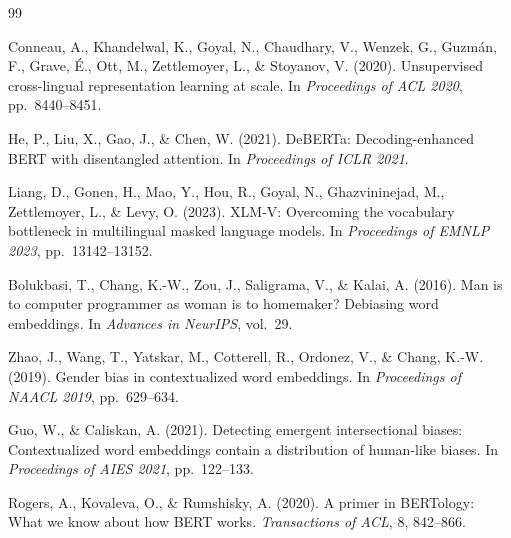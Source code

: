 \documentclass[11pt,a4paper]{article}
\begin{document}
\begin{thebibliography}{99}

Conneau, A., Khandelwal, K., Goyal, N., Chaudhary, V., Wenzek, G.,
Guzm\'{a}n, F., Grave, \'{E}., Ott, M., Zettlemoyer, L., \& Stoyanov, V.
(2020).
Unsupervised cross-lingual representation learning at scale.
In \textit{Proceedings of ACL 2020}, pp.\ 8440--8451.

He, P., Liu, X., Gao, J., \& Chen, W. (2021).
DeBERTa: Decoding-enhanced BERT with disentangled attention.
In \textit{Proceedings of ICLR 2021}.

Liang, D., Gonen, H., Mao, Y., Hou, R., Goyal, N., Ghazvininejad, M.,
Zettlemoyer, L., \& Levy, O. (2023).
XLM-V: Overcoming the vocabulary bottleneck in multilingual masked language models.
In \textit{Proceedings of EMNLP 2023}, pp.\ 13142--13152.

Bolukbasi, T., Chang, K.-W., Zou, J., Saligrama, V., \& Kalai, A. (2016).
Man is to computer programmer as woman is to homemaker?
Debiasing word embeddings.
In \textit{Advances in NeurIPS}, vol.\ 29.

Zhao, J., Wang, T., Yatskar, M., Cotterell, R., Ordonez, V., \& Chang, K.-W.
(2019).
Gender bias in contextualized word embeddings.
In \textit{Proceedings of NAACL 2019}, pp.\ 629--634.

Guo, W., \& Caliskan, A. (2021).
Detecting emergent intersectional biases: Contextualized word embeddings
contain a distribution of human-like biases.
In \textit{Proceedings of AIES 2021}, pp.\ 122--133.

Rogers, A., Kovaleva, O., \& Rumshisky, A. (2020).
A primer in BERTology: What we know about how BERT works.
\textit{Transactions of ACL}, 8, 842--866.

\end{thebibliography}
\end{document}
